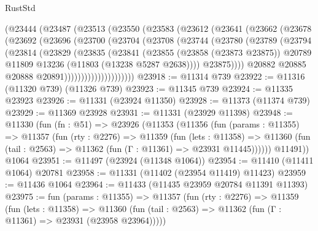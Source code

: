 \begin{lexlean}{RustStd}
\begin{coremodule}
            (@23444
              (@23487
                (@23513
                  (@23550
                    (@23583
                      (@23612
                        (@23641
                          (@23662
                            (@23678
                              (@23692
                                (@23696
                                  (@23700
                                    (@23704
                                      (@23708
                                        (@23744
                                          (@23780
                                            (@23789
                                              (@23794
                                                (@23814
                                                  (@23829
                                                    (@23835
                                                      (@23841
                                                        (@23855
                                                          (@23858 (@23873 @23875))
                                                          @20789
                                                          @11809
                                                          @13236
                                                          (@11803 (@13238 @5287 @2638))))
                                                      @23875))))
                                              @20882
                                              @20885
                                              @20888
                                              @20891)))))))))))))))))))))
@23918 := @11314 @739
@23922 := @11316 (@11320 @739) (@11326 @739)
@23923 := @11345 @739
@23924 := @11335 @23923
@23926 := @11331 (@23924 @11350)
@23928 := @11373 (@11374 @739)
@23929 := @11369 @23928
@23931 := @11331 (@23929 @11398)
@23948 := @11330
    (fun (fn : @51) =>
    @23926
      (@11353
        (@11356
          (fun (params : @11355) =>
          @11357
            (fun (rty : @2276) =>
            @11359
              (fun (lets : @11358) =>
              @11360 (fun (tail : @2563) => @11362 (fun (Γ : @11361) => @23931 @11445))))))
        @11491))
    @1064
@23951 := @11497 (@23924 (@11348 @1064))
@23954 := @11410 (@11411 @1064) @20781
@23958 := @11331 (@11402 (@23954 @11419) @11423)
@23959 := @11436 @1064
@23964 := @11433 (@11435 @23959 @20784 @11391 @11393)
@23975 := fun (params : @11355) =>
  @11357
    (fun (rty : @2276) =>
    @11359
      (fun (lets : @11358) =>
      @11360 (fun (tail : @2563) => @11362 (fun (Γ : @11361) => @23931 (@23958 @23964)))))

\end{coremodule}
\end{lexlean}
